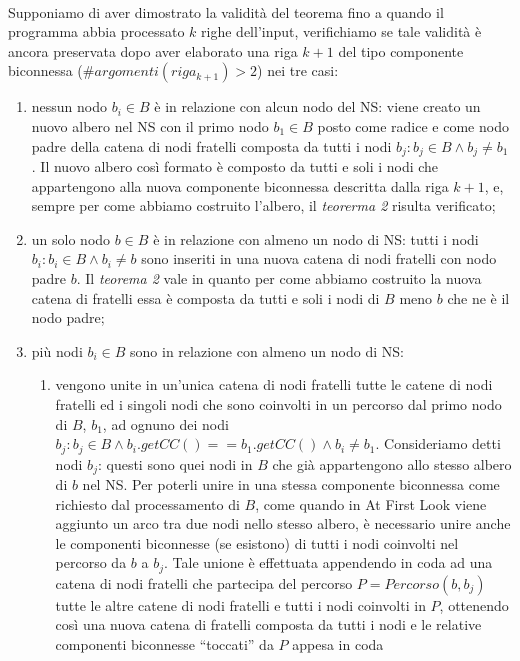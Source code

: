 \documentclass[a4paper,11pt]{report}
\begin{document}
\paragraph{}
Supponiamo di aver dimostrato la validità del teorema fino a quando il programma abbia processato $k$ righe dell'input, verifichiamo se tale
validità è ancora preservata dopo
aver elaborato una riga $k+1$ del tipo componente biconnessa ($\# argomenti\left(riga_{k+1}\right)>2$) nei tre casi:
\begin{enumerate}
 \item nessun nodo $b_i\in B$ è in relazione con alcun nodo del NS: viene creato un nuovo albero nel NS con il primo nodo $b_1\in B$ posto
come radice e come nodo padre della catena di nodi
fratelli composta da tutti i nodi $b_j:b_j\in B\wedge b_j\neq b_1$. Il nuovo albero così formato è composto da tutti e soli i nodi che
appartengono alla nuova componente biconnessa
descritta dalla riga $k+1$, e, sempre per come abbiamo costruito l'albero, il \emph{teorerma 2} risulta verificato;
  \item un solo nodo $b\in B$ è in relazione con almeno un nodo di NS: tutti i nodi $b_i:b_i\in B \wedge b_i\neq b$ sono inseriti in una
nuova catena di nodi fratelli con nodo padre $b$.
Il \emph{teorema 2} vale in quanto per come abbiamo costruito la nuova catena di fratelli essa è composta da tutti e soli i nodi di $B$ meno
$b$ che ne è il nodo padre;
 \item più nodi $b_i\in B$ sono in relazione con almeno un nodo di NS:  
 \begin{enumerate}
  \item vengono unite in un'unica catena di nodi fratelli tutte le catene di nodi fratelli ed i singoli nodi che sono coinvolti 
in un percorso dal primo nodo di $B$, $b_1$, ad ognuno dei nodi $b_j:b_j\in B\wedge b_i.getCC\left(\right)==b_1.getCC\left(\right)\wedge
b_i\neq b_1$. Consideriamo detti nodi $b_j$:
questi sono quei nodi in $B$ che già appartengono allo stesso albero di $b$ nel NS. Per poterli unire in una stessa componente biconnessa
come richiesto dal processamento di $B$,
 come quando in At First Look viene aggiunto un arco tra due nodi nello stesso albero, è necessario unire anche le componenti biconnesse (se
esistono) di tutti i nodi coinvolti nel percorso da $b$ a $b_j$.
Tale unione è effettuata appendendo in coda ad una catena di nodi fratelli che partecipa del percorso $P=Percorso\left(b,b_j\right)$ tutte
le altre catene di nodi fratelli e tutti i nodi coinvolti in $P$, 
ottenendo così una nuova catena di fratelli composta da tutti i nodi e le relative componenti biconnesse ``toccati'' da $P$ appesa in coda

\end{enumerate}
\end{enumerate}
\end{document}
